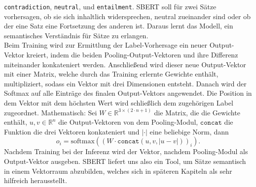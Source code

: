 \documentclass[12pt,letterpaper,ngerman]{article}
\begin{document}
\verb|contradiction|, \verb|neutral|, und \verb|entailment|.
SBERT soll für zwei Sätze vorhersagen, ob sie sich inhaltlich
widersprechen, neutral zueinander sind oder ob der eine Satz
eine Fortsetzung des anderen ist. Daraus lernt das Modell,
ein semantisches Verständnis für Sätze zu erlangen.\\
Beim Training wird zur Ermittlung der Label-Vorhersage ein 
neuer Output-Vektor kreiert, indem die beiden 
Pooling-Output-Vektoren und ihre Differenz miteinander 
konkateniert werden.
Anschließend wird dieser neue Output-Vektor mit einer Matrix,
welche durch das Training erlernte Gewichte enthält, multipliziert, 
sodass ein Vektor mit drei Dimensionen entsteht.
Danach wird der Softmax auf alle Einträge des finalen 
Output-Vektors angewendet. Die Position in dem Vektor mit dem 
höchsten Wert wird schließlich dem zugehörigen Label zugeordnet.
Mathematisch:
Sei $W \in \mathbb{R}^{3 \times (2\cdot n + 1)}$ die Matrix,
die die Gewichte enthält, 
$u,v \in \mathbb{R}^n$ die Output-Vektoren von dem Pooling-Modul,
$\texttt{concat}$ die Funktion die drei Vektoren konkateniert und
$|\cdot|$ eine beliebige Norm, dann
\[
  o_i = \text{softmax}((W \cdot \texttt{concat}(u,v, |u-v|))_i).
\]
Nachdem Training bei der Inferenz wird der Vektor, nachdem 
Pooling-Modul als Output-Vektor ausgeben. SBERT liefert uns 
also ein Tool, um Sätze semantisch in einem Vektorraum abzubilden,
welches sich in späteren Kapiteln als sehr hilfreich herausstellt.
\end{document}
